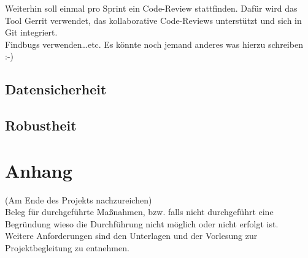 \documentclass[accentcolor=tud0b,12pt,paper=a4]{tudreport}
\begin{document}
                Weiterhin soll einmal pro Sprint ein Code-Review stattfinden. Dafür wird das Tool Gerrit verwendet, das kollaborative Code-Reviews unterstützt und sich in Git integriert.\\

                Findbugs verwenden\ldots etc. Es könnte noch jemand anderes was hierzu schreiben :-)
                
                

        \section{Datensicherheit}
        
        \section{Robustheit}
        
\appendix	
	\chapter{Anhang}
		(Am Ende des Projekts nachzureichen)\\
		Beleg für durchgeführte Maßnahmen, bzw. falls nicht durchgeführt eine Begründung wieso die Durchführung nicht möglich oder nicht erfolgt ist. \\
		Weitere Anforderungen sind den Unterlagen und der Vorlesung zur Projektbegleitung zu entnehmen.
	
\end{document}

